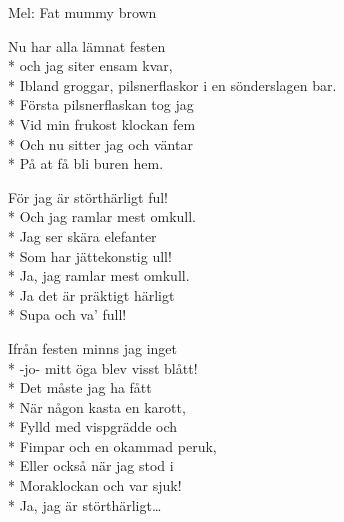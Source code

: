 \begin{SongText}
    \begin{SongInfo}
        Mel: Fat mummy brown
    \end{SongInfo}
    \begin{SongVerse}
        Nu har alla lämnat festen\\*%
        och jag siter ensam kvar,\\*%
        Ibland groggar, pilsnerflaskor i en sönderslagen bar.\\*%
        Första pilsnerflaskan tog jag\\*%
        Vid min frukost klockan fem\\*%
        Och nu sitter jag och väntar\\*%
        På at få bli buren hem.
    \end{SongVerse}
    \begin{SongVerse}
        För jag är störthärligt ful!\\*%
        Och jag ramlar mest omkull.\\*%
        Jag ser skära elefanter\\*%
        Som har jättekonstig ull!\\*%
        Ja, jag ramlar mest omkull.\\*%
        Ja det är präktigt härligt\\*%
        Supa och va’ full!
    \end{SongVerse}
    \begin{SongVerse}
        Ifrån festen minns jag inget\\*%
        -jo- mitt öga blev visst blått!\\*%
        Det måste jag ha fått\\*%
        När någon kasta en karott,\\*%
        Fylld med vispgrädde och\\*%
        Fimpar och en okammad peruk,\\*%
        Eller också när jag stod i\\*%
        Moraklockan och var sjuk!\\*%
        Ja, jag är störthärligt…
    \end{SongVerse}
\end{SongText}